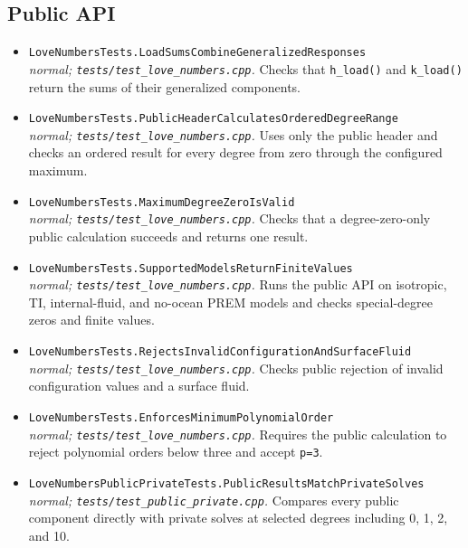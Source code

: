 \subsection*{Public API}
\begin{itemize}[leftmargin=1.4em,itemsep=0.35em]
\item {\footnotesize\texttt{LoveNumbersTests.LoadSumsCombineGeneralizedResponses}}\\
\emph{normal; \texttt{tests/test\_love\_numbers.cpp}.} Checks that \texttt{h\_load()} and \texttt{k\_load()} return the sums of their generalized components.
\item {\footnotesize\texttt{LoveNumbersTests.PublicHeaderCalculatesOrderedDegreeRange}}\\
\emph{normal; \texttt{tests/test\_love\_numbers.cpp}.} Uses only the public header and checks an ordered result for every degree from zero through the configured maximum.
\item {\footnotesize\texttt{LoveNumbersTests.MaximumDegreeZeroIsValid}}\\
\emph{normal; \texttt{tests/test\_love\_numbers.cpp}.} Checks that a degree-zero-only public calculation succeeds and returns one result.
\item {\footnotesize\texttt{LoveNumbersTests.SupportedModelsReturnFiniteValues}}\\
\emph{normal; \texttt{tests/test\_love\_numbers.cpp}.} Runs the public API on isotropic, TI, internal-fluid, and no-ocean PREM models and checks special-degree zeros and finite values.
\item {\footnotesize\texttt{LoveNumbersTests.RejectsInvalidConfigurationAndSurfaceFluid}}\\
\emph{normal; \texttt{tests/test\_love\_numbers.cpp}.} Checks public rejection of invalid configuration values and a surface fluid.
\item {\footnotesize\texttt{LoveNumbersTests.EnforcesMinimumPolynomialOrder}}\\
\emph{normal; \texttt{tests/test\_love\_numbers.cpp}.} Requires the public calculation to reject polynomial orders below three and accept \texttt{p=3}.
\item {\footnotesize\texttt{LoveNumbersPublicPrivateTests.PublicResultsMatchPrivateSolves}}\\
\emph{normal; \texttt{tests/test\_public\_private.cpp}.} Compares every public component directly with private solves at selected degrees including 0, 1, 2, and 10.
\end{itemize}

